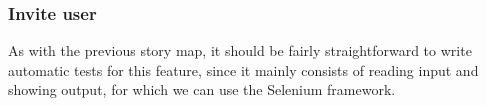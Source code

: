 \documentclass[10pt,a4paper,BCOR12mm, headexclude, footexclude,
  twoside, openright]{scrartcl} \usepackage[scaled]{helvet}
\numberwithin{equation}{section} %
\numberwithin{figure}{section} %
\numberwithin{table}{section} %
\begin{document}
\subsubsection*{Invite user}
As with the previous story map, it should be fairly straightforward to write
automatic tests for this feature, since it mainly consists of reading input and
showing output, for which we can use the Selenium framework.



\end{document}
